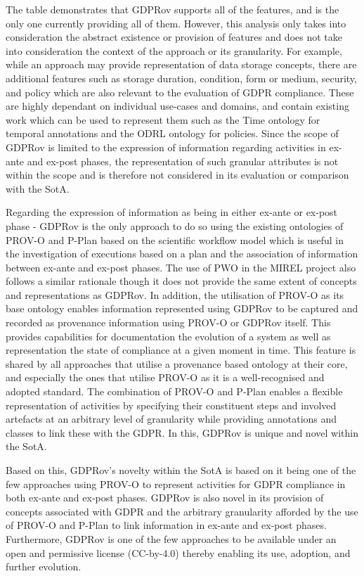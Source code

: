The table demonstrates that GDPRov supports all of the features, and is the only one currently providing all of them. However, this analysis only takes into consideration the abstract existence or provision of features and does not take into consideration the context of the approach or its granularity. For example, while an approach may provide representation of data storage concepts, there are additional features such as storage duration, condition, form or medium, security, and policy which are also relevant to the evaluation of GDPR compliance.
These are highly dependant on individual use-cases and domains, and contain existing work which can be used to represent them such as the Time ontology \cite{} for temporal annotations and the ODRL ontology \cite{} for policies.
Since the scope of GDPRov is limited to the expression of information regarding activities in ex-ante and ex-post phases, the representation of such granular attributes is not within the scope and is therefore not considered in its evaluation or comparison with the SotA.

Regarding the expression of information as being in either ex-ante or ex-post phase - GDPRov is the only approach to do so using the existing ontologies of PROV-O and P-Plan based on the scientific workflow model which is useful in the investigation of executions based on a plan and the association of information between ex-ante and ex-post phases. The use of PWO \cite{} in the MIREL project also follows a similar rationale though it does not provide the same extent of concepts and representations as GDPRov.
In addition, the utilisation of PROV-O as its base ontology enables information represented using GDPRov to be captured and recorded as provenance information using PROV-O or GDPRov itself. This provides capabilities for documentation the evolution of a system as well as representation the state of compliance at a given moment in time.
This feature is shared by all approaches that utilise a provenance based ontology at their core, and especially the ones that utilise PROV-O as it is a well-recognised and adopted standard.
The combination of PROV-O and P-Plan enables a flexible representation of activities by specifying their constituent steps and involved artefacts at an arbitrary level of granularity while providing annotations and classes to link these with the GDPR. In this, GDPRov is unique and novel within the SotA.

Based on this, GDPRov's novelty within the SotA is based on it being one of the few approaches using PROV-O to represent activities for GDPR compliance in both ex-ante and ex-post phases. GDPRov is also novel in its provision of concepts associated with GDPR and the arbitrary granularity afforded by the use of PROV-O and P-Plan to link information in ex-ante and ex-post phases.
Furthermore, GDPRov is one of the few approaches to be available under an open and permissive license (CC-by-4.0) thereby enabling its use, adoption, and further evolution.

